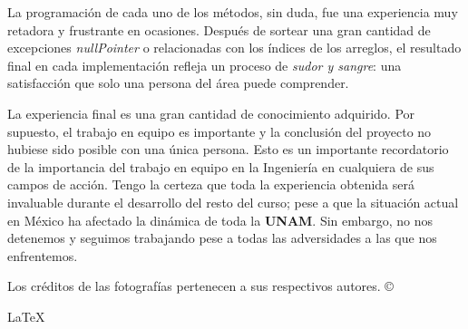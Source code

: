 \documentclass[letterpaper,12pt]{extarticle}
\begin{document}
\begin{itemize}
\begin{itemize}
\end{itemize}

La programación de cada uno de los métodos, sin duda, fue una experiencia muy retadora y frustrante en ocasiones. Después de sortear una gran cantidad de excepciones \textit{nullPointer} o relacionadas con los índices de los arreglos, el resultado final en cada implementación refleja un proceso de \textit{sudor y sangre}: una satisfacción que solo una persona del área puede comprender.

La experiencia final es una gran cantidad de conocimiento adquirido. Por supuesto, el trabajo en equipo es importante y la conclusión del proyecto no hubiese sido posible con una única persona. Esto es un importante recordatorio de la importancia del trabajo en equipo en la Ingeniería en cualquiera de sus campos de acción. Tengo la certeza que toda la experiencia obtenida será invaluable durante el desarrollo del resto del curso; pese a que la situación actual en México ha afectado la dinámica de toda la \textbf{UNAM}. Sin embargo, no nos detenemos y seguimos trabajando pese a todas las adversidades a las que nos enfrentemos.
    
    
    


\end{itemize}

            \nocite{Cairo}
            \nocite{Ceballos}
            \nocite{Cormen}
            \nocite{1}
            \nocite{Joyanes}
            \nocite{McConnell}
            \nocite{Skiena}
	        
            

\centering \small Los créditos de las fotografías pertenecen a sus respectivos autores. ©

\centering\vspace*{\fill} \LaTeX{}
\end{document}
